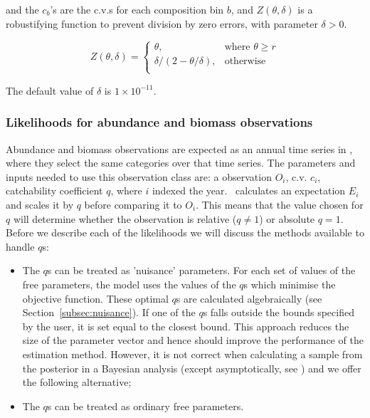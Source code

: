 and the $c_b$'s are the c.v.s for each composition bin $b$, and $Z \left(\theta,\delta \right)$ is a robustifying function to prevent division by zero errors, with parameter $\delta>0$.

\begin{equation}
Z \left(\theta,\delta \right) = \begin{cases}
\theta, & \text{where $\theta \ge r$} \\
\delta/\left( 2-\theta/\delta \right), & \text{otherwise} \\
\end{cases}
\end{equation}

The default value of $\delta$ is $1 \times 10^{-11}$.


\subsubsection{Likelihoods for abundance and biomass observations}\label{Obs:biomass}

Abundance and biomass observations are expected as an annual time series in \CNAME, where they select the same categories over that time series. The parameters and inputs needed to use this observation class are: a observation $O_i$, c.v. $c_i$, catchability coefficient $q$, where $i$ indexed the year. \CNAME\ calculates an expectation $E_i$ and scales it by $q$ before comparing it to $O_i$. This means that the value chosen for $q$ will determine whether the observation is relative ($q\neq 1$) or absolute $q = 1$. Before we describe each of the likelihoods we will discuss the methods available to handle $q$s:

\begin{itemize}
	\item The $q$s can be treated as 'nuisance' parameters. For each set of values of the free parameters, the model uses the values of the $q$s which minimise the objective function. These optimal $q$s are calculated algebraically (see Section~\ref{subsec:nuisance}). If one of the $q$s falls outside the bounds specified by the user, it is set equal to the closest bound. This approach reduces the size of the parameter vector and hence should improve the performance of the estimation method. However, it is not correct when calculating a sample from the posterior in a Bayesian analysis (except asymptotically, see \cite{Walters_ludwig_94}) and we offer the following alternative;

	\item The $q$s can be treated as ordinary free parameters.
\end{itemize}

